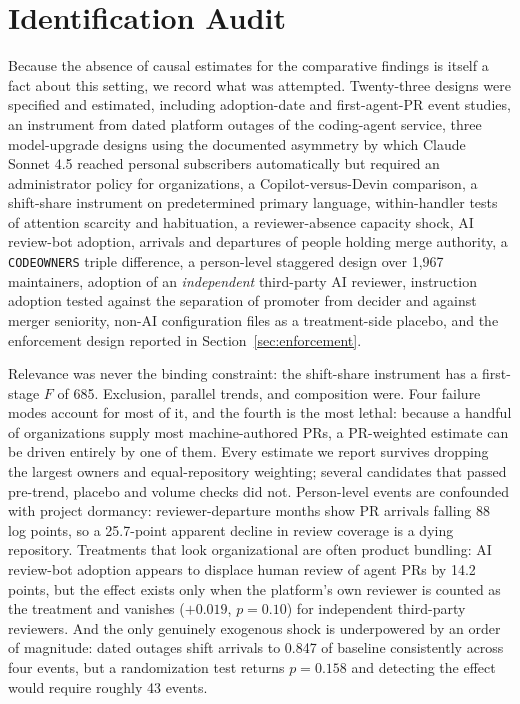 \documentclass[mnsc]{informs4}
\begin{document}
\section{Identification Audit}
\label{ec:audit}

Because the absence of causal estimates for the comparative findings is itself a
fact about this setting, we record what was attempted. Twenty-three designs were
specified and estimated, including adoption-date and first-agent-PR event studies,
an instrument from dated platform outages of the coding-agent service, three
model-upgrade designs using the documented asymmetry by which Claude Sonnet 4.5
reached personal subscribers automatically but required an administrator policy for
organizations, a Copilot-versus-Devin comparison, a shift-share instrument on
predetermined primary language, within-handler tests of attention scarcity and
habituation, a reviewer-absence capacity shock, AI review-bot adoption, arrivals and
departures of people holding merge authority, a \texttt{CODEOWNERS} triple
difference, a person-level staggered design over 1,967 maintainers, adoption of an
\emph{independent} third-party AI reviewer, instruction adoption tested against the
separation of promoter from decider and against merger seniority, non-AI
configuration files as a treatment-side placebo, and the enforcement design
reported in Section~\ref{sec:enforcement}.

Relevance was never the binding constraint: the shift-share instrument has a
first-stage $F$ of 685. Exclusion, parallel trends, and composition were. Four
failure modes account for most of it, and the fourth is the most lethal: because a
handful of organizations supply most machine-authored PRs, a PR-weighted estimate
can be driven entirely by one of them. Every estimate we report survives dropping
the largest owners and equal-repository weighting; several candidates that passed
pre-trend, placebo and volume checks did not. Person-level events are confounded with project dormancy:
reviewer-departure months show PR arrivals falling 88 log points, so a 25.7-point
apparent decline in review coverage is a dying repository. Treatments that look
organizational are often product bundling: AI review-bot adoption appears to
displace human review of agent PRs by 14.2 points, but the effect exists only when
the platform's own reviewer is counted as the treatment and vanishes ($+0.019$,
$p=0.10$) for independent third-party reviewers. And the only genuinely exogenous
shock is underpowered by an order of magnitude: dated outages shift arrivals to
0.847 of baseline consistently across four events, but a randomization test returns
$p=0.158$ and detecting the effect would require roughly 43 events.
\end{document}
